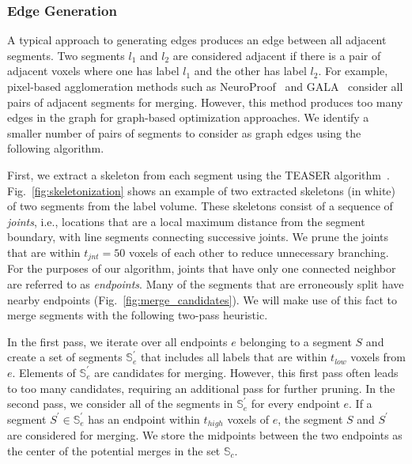 \subsubsection{Edge Generation}

A typical approach to generating edges produces an edge between all adjacent segments. Two segments $l_1$ and $l_2$ are considered adjacent if there is a pair of adjacent voxels where one has label $l_1$ and the other has label $l_2$.
For example, pixel-based agglomeration methods such as NeuroProof~\cite{10.1371/journal.pone.0125825} and GALA~\cite{nunez2014graph} consider all pairs of adjacent segments for merging.
However, this method produces too many edges in the graph for graph-based optimization approaches. We identify a smaller number of pairs of segments to consider as graph edges using the following algorithm.

First, we extract a skeleton from each segment using the TEASER algorithm~\cite{sato2000teasar,zhao2014automatic}. Fig.~\ref{fig:skeletonization} shows an example of two extracted skeletons (in white) of two segments from the label volume. These skeletons consist of a sequence of \textit{joints}, i.e., locations that are a local maximum distance from the segment boundary, with line segments connecting successive joints. We prune the joints that are within $t_{jnt} = 50$ voxels of each other to reduce unnecessary branching. For the purposes of our algorithm, joints that have only one connected neighbor are referred to as \textit{endpoints}. Many of the segments that are erroneously split have nearby endpoints  (Fig.~\ref{fig:merge_candidates}). We will make use of this fact to merge segments with the following two-pass heuristic.

In the first pass, we iterate over all endpoints $e$ belonging to a segment $S$ and create a set of segments $\mathbb{S}_e^\prime$ that includes all labels that are within $t_{low}$ voxels from $e$. Elements of $\mathbb{S}_e^\prime$ are candidates for merging. However, this first pass often leads to too many candidates, requiring an additional pass for further pruning. In the second pass, we consider all of the segments in $\mathbb{S}_e^\prime$ for every endpoint $e$. If a segment $S^\prime \in \mathbb{S}_e^\prime$ has an endpoint within $t_{high}$ voxels of $e$, the segment $S$ and $S^\prime$ are considered for merging. We store the midpoints between the two endpoints as the center of the potential merges in the set $\mathbb{S}_c$.


